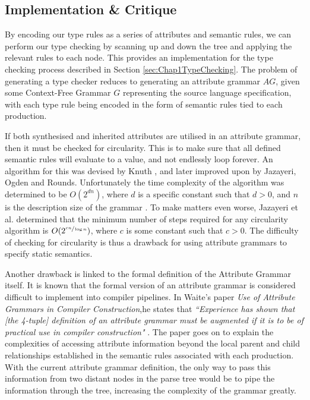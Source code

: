 \documentclass{UoYCSproject}
\begin{document}
\subsection{Implementation \& Critique}
By encoding our type rules as a series of attributes and semantic rules, we can
perform our type checking by scanning up and down the tree and applying the
relevant rules to each node. This provides an implementation for the type
checking process described in Section \ref{sec:Chap1TypeChecking}. The problem 
of generating a type checker reduces to generating an attribute grammar $AG$, 
given some Context-Free Grammar $G$ representing the source language 
specification, with each type rule being encoded in the form of semantic rules 
tied to each production. 

If both synthesised and inherited attributes are utilised in an attribute
grammar, then it must be checked for circularity. This is to make sure
that all defined semantic rules will evaluate to a value, and not endlessly
loop forever. An algorithm for this was devised by Knuth \cite{KnuthGrammars}
\cite{KnuthCorrection}, and later improved upon by Jazayeri, Ogden and Rounds.
Unfortunately the time complexity of the algorithm was determined to be 
$O(2^{dn})$, where $d$ is a specific constant such that $d>0$, and $n$ is the 
description size of the grammar \cite{OgdenAGComplexity}. To make matters even 
worse, Jazayeri et al. determined that the minimum number of steps required for 
any circularity algorithm is $O(2^{\sfrac{cn}{\log n}})$, where $c$ is some 
constant such that $c>0$. The difficulty of checking for circularity is thus 
a drawback for using attribute grammars to specify static semantics.

Another drawback is linked to the formal definition of the Attribute Grammar
itself. It is known that the formal version of an attribute grammar is 
considered difficult to implement into compiler pipelines. In Waite's 
paper \textit{Use of Attribute Grammars in Compiler Construction},he states 
that \textit{``Experience has shown that [the 4-tuple] definition of 
    an attribute grammar must be augmented if it is to be of practical use in 
    compiler construction"} \cite{WaitePaper}. The paper goes on to explain 
the complexities of accessing attribute information beyond the local parent and 
child relationships established in the semantic rules associated with each
production. With the current attribute grammar definition, the only way to pass 
this information from two distant nodes in the parse tree would be to pipe the 
information through the tree, increasing the complexity of the grammar greatly.
\end{document}
